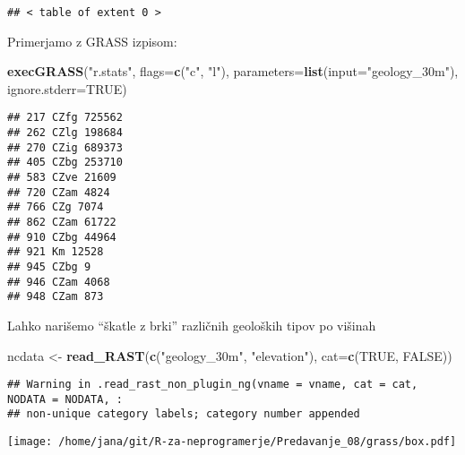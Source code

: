 \documentclass[]{article}
\newenvironment{Shaded}{\begin{snugshade}}{\end{snugshade}}
\newcommand{\KeywordTok}[1]{\textcolor[rgb]{0.13,0.29,0.53}{\textbf{#1}}}
\newcommand{\DataTypeTok}[1]{\textcolor[rgb]{0.13,0.29,0.53}{#1}}
\newcommand{\StringTok}[1]{\textcolor[rgb]{0.31,0.60,0.02}{#1}}
\newcommand{\OtherTok}[1]{\textcolor[rgb]{0.56,0.35,0.01}{#1}}
\newcommand{\OperatorTok}[1]{\textcolor[rgb]{0.81,0.36,0.00}{\textbf{#1}}}
\newcommand{\NormalTok}[1]{#1}
\begin{document}
\begin{verbatim}
## < table of extent 0 >
\end{verbatim}

Primerjamo z GRASS izpisom:

\begin{Shaded}
\begin{Highlighting}[]
\KeywordTok{execGRASS}\NormalTok{(}\StringTok{"r.stats"}\NormalTok{, }\DataTypeTok{flags=}\KeywordTok{c}\NormalTok{(}\StringTok{"c"}\NormalTok{, }\StringTok{"l"}\NormalTok{), }\DataTypeTok{parameters=}\KeywordTok{list}\NormalTok{(}\DataTypeTok{input=}\StringTok{"geology_30m"}\NormalTok{), }\DataTypeTok{ignore.stderr=}\OtherTok{TRUE}\NormalTok{)}
\end{Highlighting}
\end{Shaded}

\begin{verbatim}
## 217 CZfg 725562
## 262 CZlg 198684
## 270 CZig 689373
## 405 CZbg 253710
## 583 CZve 21609
## 720 CZam 4824
## 766 CZg 7074
## 862 CZam 61722
## 910 CZbg 44964
## 921 Km 12528
## 945 CZbg 9
## 946 CZam 4068
## 948 CZam 873
\end{verbatim}

Lahko narišemo ``škatle z brki'' različnih geoloških tipov po višinah

\begin{Shaded}
\begin{Highlighting}[]
\NormalTok{ncdata <-}\StringTok{ }\KeywordTok{read_RAST}\NormalTok{(}\KeywordTok{c}\NormalTok{(}\StringTok{"geology_30m"}\NormalTok{, }\StringTok{"elevation"}\NormalTok{), }\DataTypeTok{cat=}\KeywordTok{c}\NormalTok{(}\OtherTok{TRUE}\NormalTok{, }\OtherTok{FALSE}\NormalTok{))}
\end{Highlighting}
\end{Shaded}


\begin{verbatim}
## Warning in .read_rast_non_plugin_ng(vname = vname, cat = cat, NODATA = NODATA, :
## non-unique category labels; category number appended
\end{verbatim}

\begin{Shaded}
\end{Shaded}

\texttt{[image: /home/jana/git/R-za-neprogramerje/Predavanje\_08/grass/box.pdf]}
\end{document}

